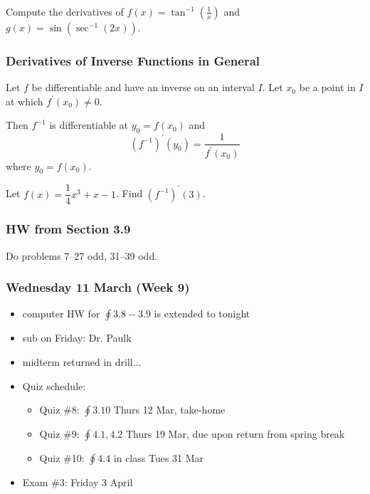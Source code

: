 \documentclass[14pt]{beamer}
\begin{document}
\begin{frame}
\frametitle{}
\begin{ex} Compute the derivatives of $f(x)=\tan^{-1}\left(\frac{1}{x}\right)$ and $g(x)=\sin \left(\sec^{-1}(2x) \right)$. \end{ex}
\end{frame}

\begin{frame}[t]
\frametitle{\small Derivatives of Inverse Functions in General}
\small
Let $f$ be differentiable and have an inverse on an interval $I$.  Let $x_0$ be a point in $I$ at which $f^{\prime}(x_0)\ne0$.

Then $f^{-1}$ is differentiable at $y_0=f(x_0)$ and 
$$\left(f^{-1}\right)^{\prime}(y_0)=\frac{1}{f^{\prime}(x_0)}$$
where $y_0=f(x_0).$

\begin{ex} Let $f(x)=\dfrac{1}{4}x^3+x-1$.  Find $\left(f^{-1}\right)^{\prime}(3)$. \end{ex}
\end{frame}

\begin{frame}
\frametitle{HW from Section 3.9}
Do problems 7--27 odd, 31--39 odd.
\end{frame}


\begin{frame}
\frametitle{Wednesday 11 March (Week 9)}
\small
\begin{itemize}
\item computer HW for $\oint 3.8-3.9$ is extended to tonight
\item sub on Friday: Dr. Paulk
\item midterm returned in drill... 
\item Quiz schedule: 
	\begin{itemize}
	\small 
	\item Quiz \#8: $\oint 3.10$ Thurs 12 Mar, take-home
	\item Quiz \#9: $\oint 4.1,4.2$ Thurs 19 Mar, due upon return from spring break
	\item Quiz \#10: $\oint 4.4$ in class Tues 31 Mar
	\end{itemize}
\item Exam \#3: Friday 3 April	
\end{itemize}
\end{frame}
\end{document}
